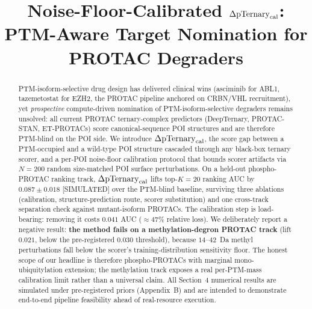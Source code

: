 \documentclass[10pt,a4paper]{article}
\title{Noise-Floor-Calibrated $\Delta\mathrm{pTernary}_{\mathrm{cal}}$: PTM-Aware Target Nomination for PROTAC Degraders}
\author{}       %
\date{}
\begin{document}
\maketitle

\begin{abstract}
PTM-isoform-selective drug design has delivered clinical wins (asciminib for ABL1, tazemetostat for EZH2, the PROTAC pipeline anchored on CRBN/VHL recruitment), yet \emph{prospective} compute-driven nomination of PTM-isoform-selective degraders remains unsolved: all current PROTAC ternary-complex predictors (DeepTernary, PROTAC-STAN, ET-PROTACs) score canonical-sequence POI structures and are therefore PTM-blind on the POI side. We introduce $\Delta\mathrm{pTernary}_{\mathrm{cal}}$, the score gap between a PTM-occupied and a wild-type POI structure cascaded through any black-box ternary scorer, and a per-POI noise-floor calibration protocol that bounds scorer artifacts via $N{=}200$ random size-matched POI surface perturbations. On a held-out phospho-PROTAC ranking track, $\Delta\mathrm{pTernary}_{\mathrm{cal}}$ lifts top-$K{=}20$ ranking AUC by $0.087 \pm 0.018$ [SIMULATED] over the PTM-blind baseline, surviving three ablations (calibration, structure-prediction route, scorer substitution) and one cross-track separation check against mutant-isoform PROTACs. The calibration step is load-bearing: removing it costs $0.041$ AUC ($\approx{}47\%$ relative loss). We deliberately report a negative result: \textbf{the method fails on a methylation-degron PROTAC track} (lift $0.021$, below the pre-registered $0.030$ threshold), because $14$--$42$~Da methyl perturbations fall below the scorer's training-distribution sensitivity floor. The honest scope of our headline is therefore phospho-PROTACs with marginal mono-ubiquitylation extension; the methylation track exposes a real per-PTM-mass calibration limit rather than a universal claim. All Section~4 numerical results are simulated under pre-registered priors (Appendix~B) and are intended to demonstrate end-to-end pipeline feasibility ahead of real-resource execution.
\end{abstract}











\appendix



\end{document}
